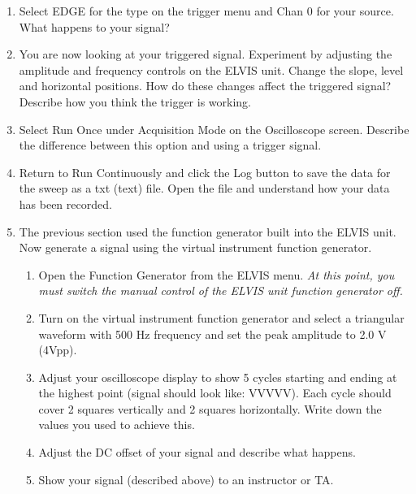 \documentclass{article}
\begin{document}
\begin{enumerate}
	\item Select EDGE for the type on the trigger menu and Chan 0 for your source. What happens to your signal?
	\item You are now looking at your triggered signal. Experiment by adjusting the amplitude and frequency controls on the ELVIS unit. Change the slope, level and horizontal positions. How do these changes affect the triggered signal? Describe how you think the trigger is working.
	\item Select Run Once under Acquisition Mode on the Oscilloscope screen. Describe the difference between this option and using a trigger signal.
	\item Return to Run Continuously and click the Log button to save the data for the sweep as a txt (text) file. Open the file and understand how your data has been recorded.
	\item The previous section used the function generator built into the ELVIS unit. Now generate a signal using the virtual instrument function generator.
		\begin{enumerate}
			\item Open the Function Generator from the ELVIS menu. \textit{At this point, you must switch the manual control of the ELVIS unit function generator off.}
			\item Turn on the virtual instrument function generator and select a triangular waveform with 500 Hz frequency and set the peak amplitude to 2.0 V (4Vpp).
			\item Adjust your oscilloscope display to show 5 cycles starting and ending at the highest point (signal should look like: VVVVV). Each cycle should cover 2 squares vertically and 2 squares horizontally. Write down the values you used to achieve this.
			\item Adjust the DC offset of your signal and describe what happens.
			\item Show your signal (described above) to an instructor or TA.
		\end{enumerate}
\end{enumerate}
\end{document}
